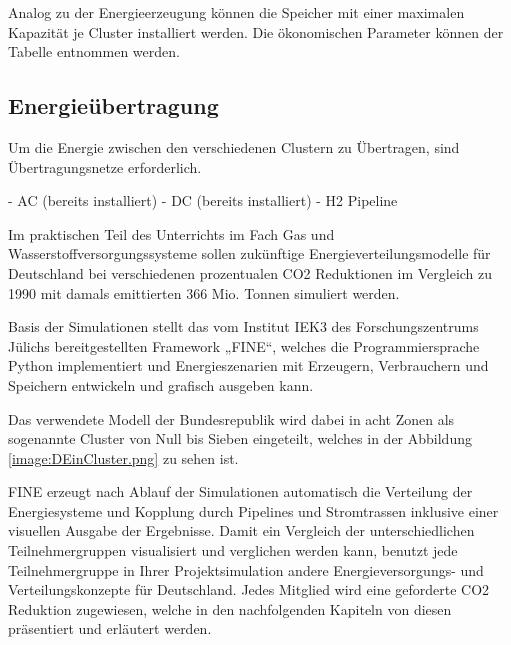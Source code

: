 Analog zu der Energieerzeugung können die Speicher mit einer maximalen Kapazität je Cluster installiert werden. Die ökonomischen Parameter können der Tabelle  entnommen werden.


\subsection{Energieübertragung}
Um die Energie zwischen den verschiedenen Clustern zu Übertragen, sind Übertragungsnetze erforderlich. 

- AC (bereits installiert)
- DC (bereits installiert)
- H2 Pipeline



\newpage
{}
Im praktischen Teil des Unterrichts im Fach Gas und Wasserstoffversorgungssysteme sollen zukünftige Energieverteilungsmodelle für Deutschland bei verschiedenen prozentualen CO2 Reduktionen im Vergleich zu 1990 mit damals emittierten 366 Mio. Tonnen simuliert werden. 

Basis der Simulationen stellt das vom Institut IEK3 des Forschungszentrums Jülichs bereitgestellten Framework „FINE“, welches die Programmiersprache Python implementiert und Energieszenarien mit Erzeugern, Verbrauchern und Speichern entwickeln und grafisch ausgeben kann.

Das verwendete Modell der Bundesrepublik wird dabei in acht Zonen als sogenannte Cluster von Null bis Sieben eingeteilt, welches in der Abbildung \ref{image:DEinCluster.png} zu sehen ist.


FINE erzeugt nach Ablauf der Simulationen automatisch die Verteilung der Energiesysteme und Kopplung durch Pipelines und Stromtrassen inklusive einer visuellen Ausgabe der Ergebnisse.
Damit ein Vergleich der unterschiedlichen Teilnehmergruppen visualisiert und verglichen werden kann, benutzt jede Teilnehmergruppe in Ihrer Projektsimulation andere Energieversorgungs- und Verteilungskonzepte für Deutschland. Jedes Mitglied wird eine geforderte CO2 Reduktion zugewiesen, welche in den nachfolgenden Kapiteln von diesen präsentiert und erläutert werden.%


